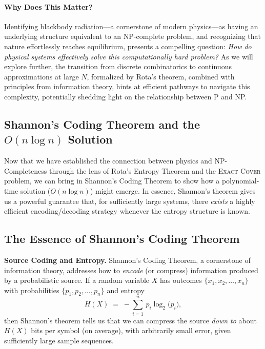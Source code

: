 \documentclass{report}
\begin{document}
\paragraph{Why Does This Matter?}
Identifying blackbody radiation—a cornerstone of modern physics—as having an underlying structure equivalent to an NP-complete problem, and recognizing that nature effortlessly reaches equilibrium, presents a compelling question: \emph{How do physical systems effectively solve this computationally hard problem?}  As we will explore further, the transition from discrete combinatorics to continuous approximations at large \(N\), formalized by Rota’s theorem, combined with principles from information theory, hints at efficient pathways to navigate this complexity, potentially shedding light on the relationship between P and NP.


\subsection*{Shannon's Coding Theorem and the $O(n \log n)$ Solution}

Now that we have established the connection between physics and NP-Completeness through the lens of Rota's Entropy Theorem and the \textsc{Exact Cover} problem, we can bring in Shannon's Coding Theorem to show how a polynomial-time solution (\(O(n \log n)\)) might emerge. In essence, Shannon's theorem gives us a powerful guarantee that, for sufficiently large systems, there \emph{exists} a highly efficient encoding/decoding strategy whenever the entropy structure is known.

\subsection*{The Essence of Shannon's Coding Theorem}

\noindent
\textbf{Source Coding and Entropy.}  
Shannon's Coding Theorem, a cornerstone of information theory, addresses how to \emph{encode} (or compress) information produced by a probabilistic source. If a random variable \(X\) has outcomes \(\{x_1, x_2, \ldots, x_n\}\) with probabilities \(\{p_1, p_2, \ldots, p_n\}\) and entropy
\[
  H(X) \;=\; -\sum_{i=1}^{n}\,p_i \log_2\bigl(p_i\bigr),
\]
then Shannon's theorem tells us that we can compress the source \emph{down to} about \(H(X)\) bits per symbol (on average), with arbitrarily small error, given sufficiently large sample sequences.
\end{document}
